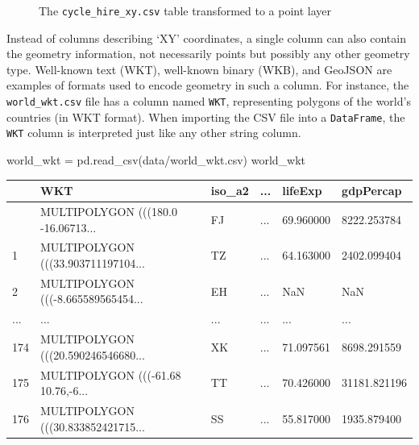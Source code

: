 \documentclass[
  letterpaper,
]{krantz}
\newenvironment{Shaded}{\begin{snugshade}}{\end{snugshade}}
\newcommand{\NormalTok}[1]{\textcolor[rgb]{0.00,0.23,0.31}{#1}}
\newcommand{\OperatorTok}[1]{\textcolor[rgb]{0.37,0.37,0.37}{#1}}
\newcommand{\StringTok}[1]{\textcolor[rgb]{0.13,0.47,0.30}{#1}}
\begin{document}
\begin{figure}[H]


\caption{\label{fig-cycle_hire_xy-layer}The \texttt{cycle\_hire\_xy.csv}
table transformed to a point layer}

\end{figure}%

Instead of columns describing `XY' coordinates, a single column can also
contain the geometry information, not necessarily points but possibly
any other geometry type. Well-known text (WKT), well-known binary (WKB),
and GeoJSON are examples of formats used to encode geometry in such a
column. For instance, the \texttt{world\_wkt.csv} file has a column
named \texttt{\textquotesingle{}WKT\textquotesingle{}}, representing
polygons of the world's countries (in WKT format). When importing the
CSV file into a \texttt{DataFrame}, the
\texttt{\textquotesingle{}WKT\textquotesingle{}} column is interpreted
just like any other string column.

\begin{Shaded}
\begin{Highlighting}[]
\NormalTok{world\_wkt }\OperatorTok{=}\NormalTok{ pd.read\_csv(}\StringTok{\textquotesingle{}data/world\_wkt.csv\textquotesingle{}}\NormalTok{)}
\NormalTok{world\_wkt}
\end{Highlighting}
\end{Shaded}

\begin{longtable}[]{@{}llllll@{}}
\toprule\noalign{}
& WKT & iso\_a2 & ... & lifeExp & gdpPercap \\
\midrule\noalign{}
\endhead
\bottomrule\noalign{}
\endlastfoot
0 & MULTIPOLYGON (((180.0 -16.06713... & FJ & ... & 69.960000 &
8222.253784 \\
1 & MULTIPOLYGON (((33.903711197104... & TZ & ... & 64.163000 &
2402.099404 \\
2 & MULTIPOLYGON (((-8.665589565454... & EH & ... & NaN & NaN \\
... & ... & ... & ... & ... & ... \\
174 & MULTIPOLYGON (((20.590246546680... & XK & ... & 71.097561 &
8698.291559 \\
175 & MULTIPOLYGON (((-61.68 10.76,-6... & TT & ... & 70.426000 &
31181.821196 \\
176 & MULTIPOLYGON (((30.833852421715... & SS & ... & 55.817000 &
1935.879400 \\
\end{longtable}
\end{document}
